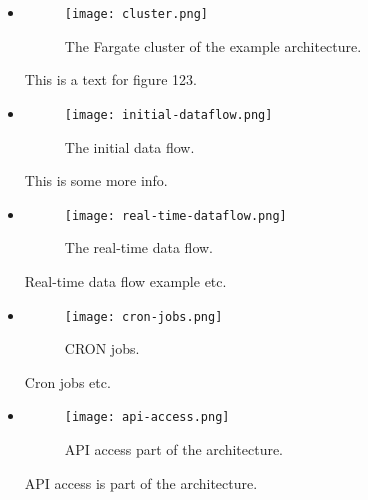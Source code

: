 \begin{itemize}
  \item \begin{figure}[!ht]
          \centering
          \texttt{[image: cluster.png]}
          \caption{The Fargate cluster of the example architecture.}
          \label{fig:cluster}
        \end{figure}

        This is a text for figure 123.

  \item  \begin{figure}[!ht]
          \centering
          \texttt{[image: initial-dataflow.png]}
          \caption{The initial data flow.}
          \label{fig:initial-flow}
        \end{figure}

        This is some more info.

  \item  \begin{figure}[!ht]
          \centering
          \texttt{[image: real-time-dataflow.png]}
          \caption{The real-time data flow.}
          \label{fig:realtime-flow}
        \end{figure}

        Real-time data flow example etc.

  \item \begin{figure}[!ht]
          \centering
          \texttt{[image: cron-jobs.png]}
          \caption{CRON jobs.}
          \label{fig:cron}
        \end{figure}

        Cron jobs etc.

  \item \begin{figure}[!ht]
          \centering
          \texttt{[image: api-access.png]}
          \caption{API access part of the architecture.}
          \label{fig:api-access}
        \end{figure}

        API access is part of the architecture.

\end{itemize}

